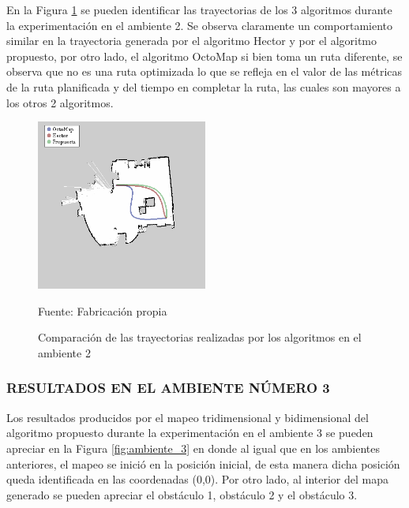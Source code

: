 En la Figura \ref{fig:tray_02} se pueden identificar las trayectorias de los 3 algoritmos durante la experimentación en el ambiente 2. Se observa claramente un comportamiento similar en la trayectoria generada por el algoritmo Hector y por el algoritmo propuesto, por otro lado, el algoritmo OctoMap si bien toma un ruta diferente, se observa que no es una ruta optimizada lo que se refleja en el valor de las métricas de la ruta planificada y del tiempo en completar la ruta, las cuales son mayores a los otros 2 algoritmos.


\begin{figure}[h]
    \centering
    \includegraphics[width=0.5\textwidth]{figures/05experimentacion/r01.png}
    \caption{ Comparación de las trayectorias realizadas por los algoritmos en el ambiente 2} 
    \label{fig:tray_02}
    Fuente: Fabricación propia
\end{figure}

\newpage
\subsubsection{RESULTADOS EN EL AMBIENTE NÚMERO 3}

Los resultados producidos por el mapeo tridimensional y bidimensional del algoritmo propuesto durante la experimentación en el ambiente 3 se pueden apreciar en la Figura \ref{fig:ambiente_3} en donde al igual que en los ambientes anteriores, el mapeo se inició en la posición inicial, de esta manera dicha posición queda identificada en las coordenadas (0,0). Por otro lado, al interior del mapa generado se pueden apreciar el obstáculo 1, obstáculo 2 y el obstáculo 3.


